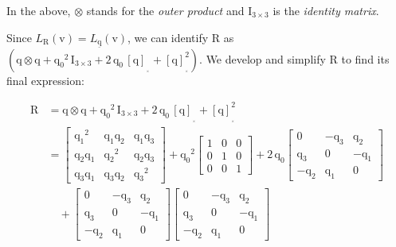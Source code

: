 \bigskip

\noindent In the above, $\otimes$ stands for the \textit{outer product} and $\bm{\mathrm{I}}_{3\times3}$ is the \textit{identity matrix}. 

\noindent Since $L_{\bm{\mathrm{R}}}(\bm{\mathrm{v}}) = L_{\underline{\bm{\mathrm{q}}}}(\bm{\mathrm{v}})$, we can identify $\bm{\mathrm{R}}$ as  $(\bm{\mathrm{q}}\otimes\bm{\mathrm{q}} + {\mathrm{q}_0}^2\,\bm{\mathrm{I}}_{3\times3} + 2\,\mathrm{q}_0\,[\bm{\mathrm{q}}]_{_{_\times}}\!\! + [\bm{\mathrm{q}}]_{_{_\times}}^2)$. We develop and simplify $\bm{\mathrm{R}}$ to find its final expression:

\begin{align*}
	\bm{\mathrm{R}} &= \bm{\mathrm{q}}\otimes\bm{\mathrm{q}} + {\mathrm{q}_0}^2\,\bm{\mathrm{I}}_{3\times3} + 2\,\mathrm{q}_0\,[\bm{\mathrm{q}}]_{_{_\times}}\!\! + [\bm{\mathrm{q}}]_{_{_\times}}^2 \\
	&= \begin{bmatrix}
    	{\mathrm{q}_1}^2 & \mathrm{q}_1\mathrm{q}_2 & \mathrm{q}_1\mathrm{q}_3 \\
    	\mathrm{q}_2\mathrm{q}_1 & {\mathrm{q}_2}^2 & \mathrm{q}_2\mathrm{q}_3 \\
    	\mathrm{q}_3\mathrm{q}_1 & \mathrm{q}_3\mathrm{q}_2 & {\mathrm{q}_3}^2
		\end{bmatrix} 
		+ {\mathrm{q}_0}^2
		\begin{bmatrix}
    	1 & 0 & 0 \\
    	0 & 1 & 0 \\
    	0 & 0 & 1
		\end{bmatrix}
		+
		2\,\mathrm{q}_0 \begin{bmatrix}
    	0 & -\mathrm{q}_3 & \mathrm{q}_2 \\
    	\mathrm{q}_3 & 0 & -\mathrm{q}_1 \\
    	-\mathrm{q}_2 & \mathrm{q}_1 & 0
		\end{bmatrix} \\
		&\quad+
		\begin{bmatrix}
    	0 & -\mathrm{q}_3 & \mathrm{q}_2 \\
    	\mathrm{q}_3 & 0 & -\mathrm{q}_1 \\
    	-\mathrm{q}_2 & \mathrm{q}_1 & 0
		\end{bmatrix}
		\begin{bmatrix}
    	0 & -\mathrm{q}_3 & \mathrm{q}_2 \\
    	\mathrm{q}_3 & 0 & -\mathrm{q}_1 \\
    	-\mathrm{q}_2 & \mathrm{q}_1 & 0

\end{bmatrix}
\end{align*}
